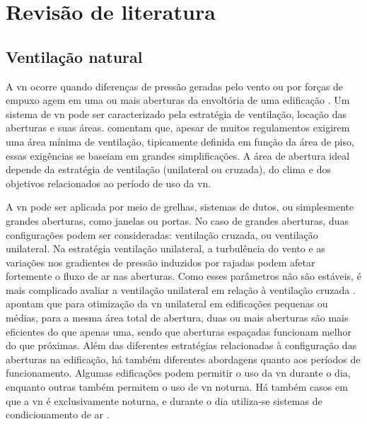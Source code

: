 \chapter{Revisão de literatura}

\section{Ventilação natural}

A \acrfull{vn} ocorre quando diferenças de pressão geradas pelo vento ou por forças de empuxo agem em uma ou mais aberturas da envoltória de uma edificação \cite{CarrilhodaGraca2016}. Um sistema de \acrshort{vn} pode ser caracterizado pela estratégia de ventilação, locação das aberturas e suas áreas.   comentam que, apesar de muitos regulamentos exigirem uma área mínima de ventilação, tipicamente definida em função da área de piso, essas exigências se baseiam em grandes simplificações. A área de abertura ideal depende da estratégia de ventilação (unilateral ou cruzada), do clima e dos objetivos relacionados ao período de uso da \acrshort{vn}.

A \acrshort{vn} pode ser aplicada por meio de grelhas, sistemas de dutos, ou simplesmente grandes aberturas, como janelas ou portas. No caso de grandes aberturas, duas configurações podem ser consideradas: ventilação cruzada, ou ventilação unilateral. Na estratégia ventilação unilateral, a turbulência do vento e as variações nos gradientes de pressão induzidos por rajadas podem afetar fortemente o fluxo de ar nas aberturas.
Como esses parâmetros não são estáveis, é mais complicado avaliar a ventilação unilateral em relação à ventilação cruzada \cite{Freire2013}.
 apontam que para otimização da \acrshort{vn} unilateral em edificações pequenas ou médias, para a mesma área total de abertura, duas ou mais aberturas são mais eficientes do que apenas uma, sendo que aberturas espaçadas funcionam melhor do que próximas.	%
Além das diferentes estratégias relacionadas à configuração das aberturas na edificação, há também diferentes abordagens quanto aos períodos de funcionamento. Algumas edificações podem permitir o uso da \acrshort{vn} durante o dia, enquanto outras também permitem o uso de \acrshort{vn} noturna. Há também casos em que a \acrshort{vn} é exclusivamente noturna, e durante o dia utiliza-se sistemas de condicionamento de ar \cite{Pesic2018}.

